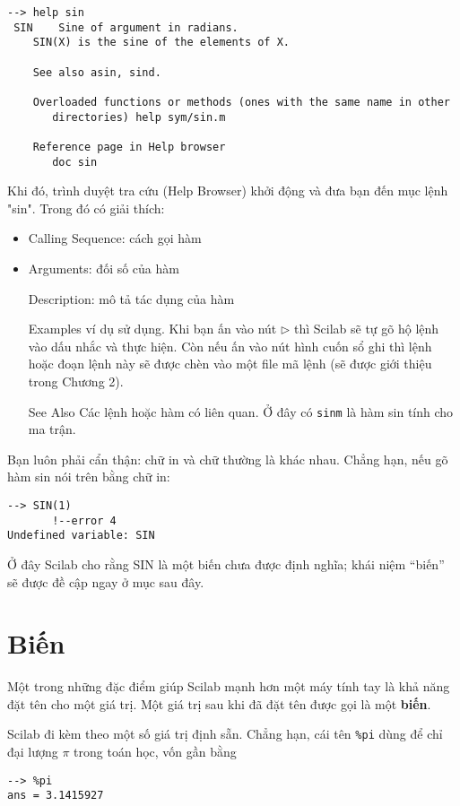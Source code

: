 \documentclass[12pt]{book}
\begin{document}
\begin{verbatim}
--> help sin
 SIN    Sine of argument in radians.
    SIN(X) is the sine of the elements of X.
 
    See also asin, sind.

    Overloaded functions or methods (ones with the same name in other
       directories) help sym/sin.m

    Reference page in Help browser
       doc sin
\end{verbatim}
%
Khi đó, trình duyệt tra cứu (Help Browser) khởi động và đưa bạn đến
mục lệnh "sin". Trong đó có giải thích:
\begin{itemize}
\item Calling Sequence: cách gọi hàm
\item Arguments: đối số của hàm
\item[Description:] mô tả tác dụng của hàm
\item[Examples] ví dụ sử dụng. Khi bạn ấn vào nút $\triangleright$ thì 
Scilab sẽ tự gõ hộ lệnh vào dấu nhắc và thực hiện. Còn nếu ấn vào nút
hình cuốn sổ ghi thì lệnh hoặc đoạn lệnh này sẽ được chèn vào một
file mã lệnh (sẽ được giới thiệu trong Chương 2).
\item[See Also] Các lệnh hoặc hàm có liên quan. Ở đây có 
\texttt{sinm} là hàm sin tính cho ma trận.
\end{itemize}


Bạn luôn phải cẩn thận: chữ in và chữ thường là khác nhau. Chẳng hạn,
nếu gõ hàm sin nói trên bằng chữ in:

\begin{verbatim}
--> SIN(1)
       !--error 4 
Undefined variable: SIN
\end{verbatim}
%

Ở đây Scilab cho rằng SIN là một biến chưa được định nghĩa; 
khái niệm ``biến'' sẽ được đề cập ngay ở mục sau đây.


\section{Biến}

Một trong những đặc điểm giúp Scilab mạnh hơn một máy tính tay
là khả năng đặt tên cho một giá trị. Một giá trị sau khi đã đặt tên
được gọi là một {\bf biến}.

Scilab đi kèm theo một số giá trị định sẵn. Chẳng hạn, 
cái tên {\tt \%pi} dùng để chỉ
đại lượng $\pi$ trong toán học, vốn gần bằng

\begin{verbatim}
--> %pi
ans = 3.1415927
\end{verbatim}
\end{document}
